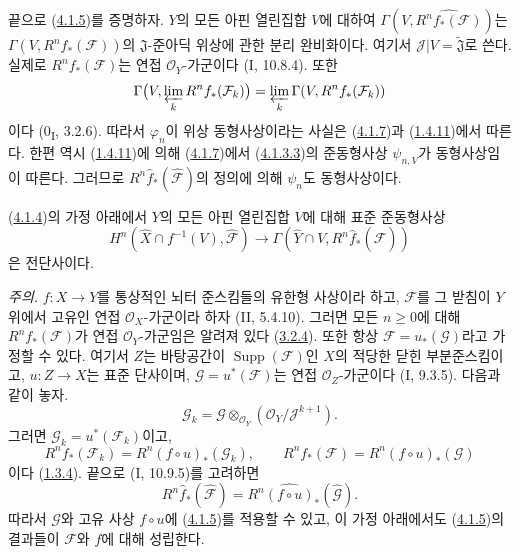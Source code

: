 \begin{env}[4.1.8]
\label{III.4.1.8-fr}
끝으로 (\hyperref[III.4.1.5-fr]{4.1.5})를 증명하자. $Y$의 모든 아핀
열린집합 $V$에 대하여
$\Gamma(V,\widehat{R^nf_*(\mathcal F)})$는
$\Gamma(V,R^nf_*(\mathcal F))$의 $\mathfrak J$-준아딕 위상에 관한
분리 완비화이다. 여기서
$\mathcal J|V=\widetilde{\mathfrak J}$로 쓴다. 실제로
$R^nf_*(\mathcal F)$는 연접 $\mathcal O_Y$-가군이다 (I, 10.8.4).
또한
\[
\Gamma\bigl(V,\varprojlim_kR^nf_*(\mathcal F_k)\bigr)
=\varprojlim_k\Gamma(V,R^nf_*(\mathcal F_k))
\]
이다 (0\textsubscript{I}, 3.2.6). 따라서 $\varphi_n$이 위상
동형사상이라는 사실은 (\hyperref[III.4.1.7-fr]{4.1.7})과
(\hyperref[III.1.4.11-fr]{1.4.11})에서 따른다. 한편 역시
(\hyperref[III.1.4.11-fr]{1.4.11})에 의해
(\hyperref[III.4.1.7-fr]{4.1.7})에서
(\hyperref[III.4.1.3.3-fr]{4.1.3.3})의 준동형사상 $\psi_{n,V}$가
동형사상임이 따른다. 그러므로
$R^n\widehat f_*(\widehat{\mathcal F})$의 정의에 의해 $\psi_n$도
동형사상이다.
\end{env}

\begin{corollary}[4.1.9]
\label{III.4.1.9-fr}
(\hyperref[III.4.1.4-fr]{4.1.4})의 가정 아래에서 $Y$의 모든 아핀
열린집합 $V$에 대해 표준 준동형사상
\[
H^n(\widehat X\cap f^{-1}(V),\widehat{\mathcal F})
\longrightarrow\Gamma(\widehat Y\cap V,
R^n\widehat f_*(\widehat{\mathcal F}))
\]
은 전단사이다.
\end{corollary}

\begin{env}[4.1.10]
\label{III.4.1.10-fr}
\emph{주의.}
$f:X\to Y$를 통상적인 뇌터 준스킴들의 유한형 사상이라 하고,
$\mathcal F$를 그 받침이 $Y$ 위에서 고유인 연접
$\mathcal O_X$-가군이라 하자 (II, 5.4.10). 그러면 모든 $n\geq0$에
대해 $R^nf_*(\mathcal F)$가 연접 $\mathcal O_Y$-가군임은 알려져 있다
(\hyperref[III.3.2.4-fr]{3.2.4}). 또한 항상
$\mathcal F=u_*(\mathcal G)$라고 가정할 수 있다. 여기서 $Z$는
바탕공간이 $\operatorname{Supp}(\mathcal F)$인 $X$의 적당한 닫힌
부분준스킴이고, $u:Z\to X$는 표준 단사이며,
$\mathcal G=u^*(\mathcal F)$는 연접 $\mathcal O_Z$-가군이다
(I, 9.3.5). 다음과 같이 놓자.
\[
\mathcal G_k=\mathcal G\otimes_{\mathcal O_Y}
(\mathcal O_Y/\mathcal J^{k+1}).
\]
그러면 $\mathcal G_k=u^*(\mathcal F_k)$이고,
\[
R^nf_*(\mathcal F_k)=R^n(f\circ u)_*(\mathcal G_k),\qquad
R^nf_*(\mathcal F)=R^n(f\circ u)_*(\mathcal G)
\]
이다 (\hyperref[III.1.3.4-fr]{1.3.4}). 끝으로 (I, 10.9.5)를 고려하면
\[
R^n\widehat f_*(\widehat{\mathcal F})
=R^n\widehat{(f\circ u)}_*(\widehat{\mathcal G}).
\]
따라서 $\mathcal G$와 고유 사상 $f\circ u$에
(\hyperref[III.4.1.5-fr]{4.1.5})를 적용할 수 있고, 이 가정 아래에서도
(\hyperref[III.4.1.5-fr]{4.1.5})의 결과들이 $\mathcal F$와 $f$에 대해
성립한다.
\end{env}


